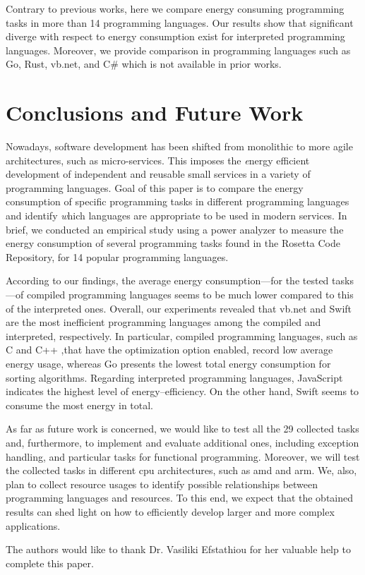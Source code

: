 Contrary to previous works, here we compare energy consuming 
programming tasks in more than 14 programming languages.
Our results show that significant diverge with respect to 
energy consumption exist for interpreted programming languages. 
Moreover, we provide comparison in programming languages such 
as Go, Rust, {\sc vb.net}, and C\# which is not available in 
prior works.


\section{Conclusions and Future Work} \label{conclusiona_and_future_work}


Nowadays, software development has been shifted from
monolithic to more agile architectures, such as micro-services.
This imposes the {\emph energy efficient} development of independent and reusable
small services in a variety of programming languages.
Goal of this paper is to compare the energy consumption
of specific programming tasks in different programming languages
and identify {\emph which} languages are appropriate to be used in modern services.
In brief, we conducted an empirical study
using a power analyzer to measure the energy consumption
of several programming tasks found in the Rosetta Code Repository,
for 14 popular programming languages.

According to our findings,
the average energy consumption---for the tested tasks---of 
compiled programming languages
seems to be much lower compared to this of the interpreted ones.
Overall, our experiments revealed that {\sc vb.net} and Swift are 
the most inefficient programming languages among the compiled 
and interpreted, respectively.
In particular, compiled programming languages, such as 
C and C++ ,that have the optimization option enabled,
record low average energy usage, whereas Go presents the lowest 
total energy consumption for sorting algorithms. 
Regarding interpreted programming languages,
JavaScript indicates the highest level of energy--efficiency.
On the other hand, Swift seems to consume the most energy in total.

As far as future work is concerned,
we would like to test all the 29 collected 
tasks and, furthermore, to implement and evaluate additional ones,
including exception handling,
and particular tasks for functional programming. 
Moreover, we will test the collected tasks in different {\sc cpu} 
architectures, such as {\sc amd} and {\sc arm}. 
We, also, plan to collect resource usages to identify 
possible relationships between programming  languages and resources. 
To this end, we expect that the obtained results can shed light
on how to efficiently develop larger and more complex applications.

\begin{acks}
	The authors would like to thank Dr. Vasiliki Efstathiou for her 
	valuable help to complete this paper.
\end{acks}



